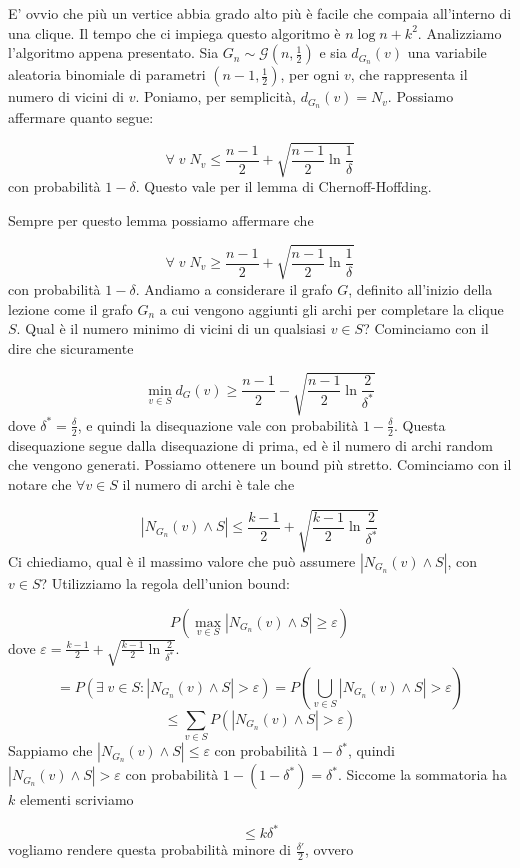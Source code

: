 \documentclass[12pt]{report}
\begin{document}
\noindent
E' ovvio che più un vertice abbia grado alto più è facile che compaia all'interno di una clique. Il tempo che ci impiega questo algoritmo è $n \log n + k^2$. Analizziamo l'algoritmo appena presentato. Sia $G_n \sim \mathcal{G}(n,\frac{1}{2})$ e sia $d_{G_n}(v)$ una variabile aleatoria binomiale di parametri $(n-1,\frac{1}{2})$, per ogni $v$, che rappresenta il numero di vicini di $v$. Poniamo, per semplicità, $d_{G_n}(v) = N_v$. Possiamo affermare quanto segue:

$$\forall \; v \; N_v \leq \frac{n-1}{2} + \sqrt{\frac{n-1}{2} \ln {\frac{1}{\delta}}}$$
con probabilità $1 - \delta$. Questo vale per il lemma di Chernoff-Hoffding.


Sempre per questo lemma possiamo affermare che 

$$\forall \; v \; N_v \geq \frac{n-1}{2} + \sqrt{\frac{n-1}{2} \ln {\frac{1}{\delta}}}$$
con probabilità $1 - \delta$.
Andiamo a considerare il grafo $G$, definito all'inizio della lezione come il grafo $G_n$ a cui vengono aggiunti gli archi per completare la clique $S$. Qual è il numero minimo di vicini di un qualsiasi $v \in S$? Cominciamo con il dire che sicuramente

$$\min_{v \in S} d_G(v) \geq \frac{n-1}{2} - \sqrt{\frac{n-1}{2} \ln{\frac{2}{\delta^*}}}$$
dove $\delta^* = \frac{\delta}{2}$, e quindi la disequazione vale con probabilità $1 - \frac{\delta}{2}$. Questa disequazione segue dalla disequazione di prima, ed è il numero di archi random che vengono generati. Possiamo ottenere un bound più stretto. Cominciamo con il notare che $\forall v \in S$ il numero di archi è tale che 

$$|N_{G_n}(v) \land S| \leq \frac{k-1}{2} + \sqrt{\frac{k-1}{2}\ln{\frac{2}{\delta^*}}}$$
Ci chiediamo, qual è il massimo valore che può assumere $|N_{G_n}(v) \land S|$, con $v \in S$? Utilizziamo la regola dell'union bound:

$$P(\max_{v \in S} |N_{G_n}(v) \land S| \geq \varepsilon )$$
dove $\varepsilon = \frac{k-1}{2} + \sqrt{\frac{k-1}{2}\ln{\frac{2}{\delta^*}}}$.
$$= P( \exists \; v \in S: |N_{G_n}(v) \land S| > \varepsilon) = P(\bigcup_{v \in S} |N_{G_n}(v) \land S| > \varepsilon)$$
$$\leq \sum_{v \in S} P(|N_{G_n}(v) \land S| > \varepsilon)$$
Sappiamo che $|N_{G_n}(v) \land S| \leq \varepsilon$  con probabilità $1-\delta^*$, quindi $|N_{G_n}(v) \land S| > \varepsilon$ con probabilità $1 - (1-\delta^*) = \delta^*$. Siccome la sommatoria ha $k$ elementi scriviamo

$$\leq k \delta^*$$
vogliamo rendere questa probabilità minore di $\frac{\delta'}{2}$, ovvero
\end{document}
